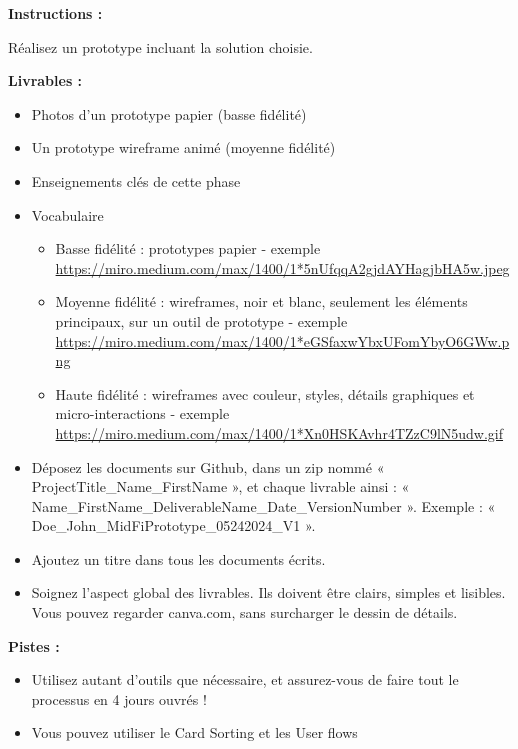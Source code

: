 \makeheaderfiles

\textbf{Instructions :}

Réalisez un prototype incluant la solution choisie.

\textbf{Livrables :}

\begin{itemize}
\item Photos d'un prototype papier (basse fidélité)
\item Un prototype wireframe animé (moyenne fidélité)
\item Enseignements clés de cette phase
\item Vocabulaire
\begin{itemize}
\item Basse fidélité : prototypes papier - exemple \url{https://miro.medium.com/max/1400/1*5nUfqqA2gjdAYHagjbHA5w.jpeg}
\item Moyenne fidélité : wireframes, noir et blanc, seulement les éléments principaux, sur un outil de prototype - exemple \url{https://miro.medium.com/max/1400/1*eGSfaxwYbxUFomYbyO6GWw.png}
\item Haute fidélité : wireframes avec couleur, styles, détails graphiques et micro-interactions - exemple \url{https://miro.medium.com/max/1400/1*Xn0HSKAvhr4TZzC9lN5udw.gif}
\end{itemize}
\item Déposez les documents sur Github, dans un zip nommé « ProjectTitle\_Name\_FirstName », et chaque livrable ainsi : « Name\_FirstName\_DeliverableName\_Date\_VersionNumber ». Exemple : « Doe\_John\_MidFiPrototype\_05242024\_V1 ».
\item Ajoutez un titre dans tous les documents écrits.
\item Soignez l'aspect global des livrables. Ils doivent être clairs, simples et lisibles. Vous pouvez regarder canva.com, sans surcharger le dessin de détails.
\end{itemize}

\textbf{Pistes :}

\begin{itemize}
\item Utilisez autant d'outils que nécessaire, et assurez-vous de faire tout le processus en 4 jours ouvrés !
\item Vous pouvez utiliser le Card Sorting et les User flows
\end{itemize}

